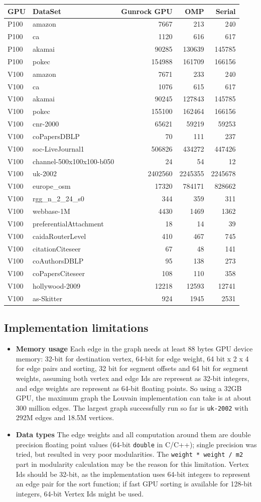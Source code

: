 \documentclass[10pt,article,oneside]{memoir}
\begin{document}
\begin{longtable}[c]{@{}llrrr@{}}
\toprule
GPU & DataSet & Gunrock GPU & OMP & Serial\tabularnewline
\midrule
\endhead
P100 & amazon & 7667 & 213 & 240\tabularnewline
P100 & ca & 1120 & 616 & 617\tabularnewline
P100 & akamai & 90285 & 130639 & 145785\tabularnewline
P100 & pokec & 154988 & 161709 & 166156\tabularnewline
V100 & amazon & 7671 & 233 & 240\tabularnewline
V100 & ca & 1076 & 615 & 617\tabularnewline
V100 & akamai & 90245 & 127843 & 145785\tabularnewline
V100 & pokec & 155100 & 162464 & 166156\tabularnewline
V100 & cnr-2000 & 65621 & 59219 & 59253\tabularnewline
V100 & coPapersDBLP & 70 & 111 & 237\tabularnewline
V100 & soc-LiveJournal1 & 506826 & 434272 & 447426\tabularnewline
V100 & channel-500x100x100-b050 & 24 & 54 & 12\tabularnewline
V100 & uk-2002 & 2402560 & 2245355 & 2245678\tabularnewline
V100 & europe\_osm & 17320 & 784171 & 828662\tabularnewline
V100 & rgg\_n\_2\_24\_s0 & 344 & 359 & 311\tabularnewline
V100 & webbase-1M & 4430 & 1469 & 1362\tabularnewline
V100 & preferentialAttachment & 18 & 14 & 39\tabularnewline
V100 & caidaRouterLevel & 410 & 467 & 745\tabularnewline
V100 & citationCiteseer & 67 & 48 & 141\tabularnewline
V100 & coAuthorsDBLP & 95 & 138 & 273\tabularnewline
V100 & coPapersCiteseer & 108 & 110 & 358\tabularnewline
V100 & hollywood-2009 & 12218 & 12593 & 12741\tabularnewline
V100 & as-Skitter & 924 & 1945 & 2531\tabularnewline
\bottomrule
\end{longtable}

\subsection{Implementation
limitations}\label{implementation-limitations-1}

\begin{itemize}
\item
  \textbf{Memory usage} Each edge in the graph needs at least 88 bytes
  GPU device memory: 32-bit for destination vertex, 64-bit for edge
  weight, 64 bit x 2 x 4 for edge pairs and sorting, 32 bit for segment
  offsets and 64 bit for segment weights, assuming both vertex and edge
  Ids are represent as 32-bit integers, and edge weights are represent
  as 64-bit floating points. So using a 32GB GPU, the maximum graph the
  Louvain implementation can take is at about 300 million edges. The
  largest graph successfully run so far is \texttt{uk-2002} with 292M
  edges and 18.5M vertices.
\item
  \textbf{Data types} The edge weights and all computation around them
  are double precision floating point values (64-bit \texttt{double} in
  C/C++); single precision was tried, but resulted in very poor
  modularities. The \texttt{weight\ *\ weight\ /\ m2} part in modularity
  calculation may be the reason for this limitation. Vertex Ids should
  be 32-bit, as the implementation uses 64-bit integers to represent an
  edge pair for the sort function; if fast GPU sorting is available for
  128-bit integers, 64-bit Vertex Ids might be used.
\end{itemize}
\end{document}
